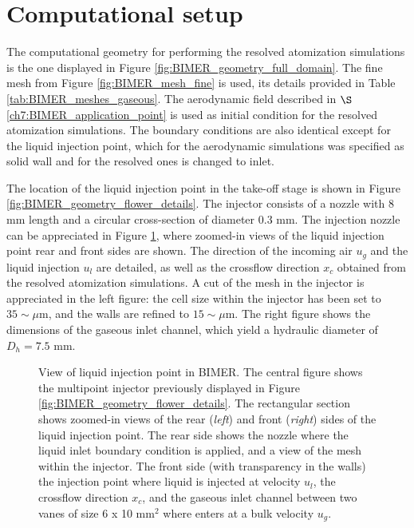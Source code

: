 \section{Computational setup}
\label{sec:ch8_BIMER_computational_setup}

The computational geometry for performing the resolved atomization simulations is the one displayed in Figure \ref{fig:BIMER_geometry_full_domain}. The fine mesh from Figure \ref{fig:BIMER_mesh_fine} is used, its details provided in Table \ref{tab:BIMER_meshes_gaseous}. The aerodynamic field described in $\S$\ref{ch7:BIMER_application_point} is used as initial condition for the resolved atomization simulations. The boundary conditions are also identical except for the liquid injection point, which for the aerodynamic simulations was specified as solid wall and for the resolved ones is changed to inlet. 

The location of the liquid injection point in the take-off stage is shown in Figure \ref{fig:BIMER_geometry_flower_details}. The injector consists of a nozzle with 8 mm length and a circular cross-section of diameter 0.3 mm. The injection nozzle can be appreciated in Figure \ref{fig:BIMER_liquid_injector_views}, where zoomed-in views of the liquid injection point rear and front sides are shown. The direction of the incoming air $u_g$ and the liquid injection $u_l$ are detailed, as well as the crossflow direction $x_c$ obtained from the resolved atomization simulations. A cut of the mesh in the injector is appreciated in the left figure: the cell size within the injector has been set to $35 \sim \mu$m, and the walls are refined to $15 \sim \mu$m. The right figure shows the dimensions of the gaseous inlet channel, which yield a hydraulic diameter of $D_h = 7.5$ mm. 


\begin{figure}[h!]
	\centering
	\caption[View of liquid injection point in BIMER]{View of liquid injection point in BIMER. The central figure shows the multipoint injector previously displayed in Figure \ref{fig:BIMER_geometry_flower_details}. The rectangular section shows zoomed-in views of the rear (\textsl{left}) and front (\textsl{right}) sides of the liquid injection point. The rear side shows the nozzle where the liquid inlet boundary condition is applied, and a view of the mesh within the injector. The front side (with transparency in the walls) the injection point where liquid is injected at velocity $u_l$, the crossflow direction $x_c$, and the gaseous inlet channel between two vanes of size 6 x 10 mm$^2$ where enters at a bulk velocity $u_g$.}%
	\label{fig:BIMER_liquid_injector_views}
\end{figure}

